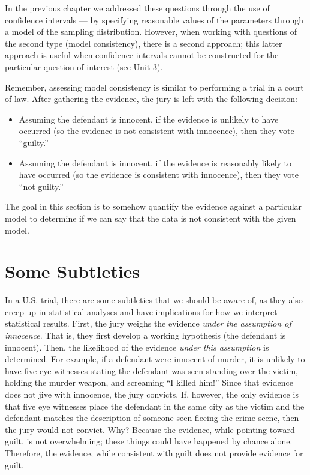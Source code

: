 \documentclass[]{book}
\providecommand{\tightlist}{%
  \setlength{\itemsep}{0pt}\setlength{\parskip}{0pt}}
\theoremstyle{plain}
\theoremstyle{mydefn}
\theoremstyle{myexmpl}
\theoremstyle{remark}
\begin{document}
In the previous chapter we addressed these questions through the use of
confidence intervals --- by specifying reasonable values of the
parameters through a model of the sampling distribution. However, when
working with questions of the second type (model consistency), there is
a second approach; this latter approach is useful when confidence
intervals cannot be constructed for the particular question of interest
(see Unit 3).

Remember, assessing model consistency is similar to performing a trial
in a court of law. After gathering the evidence, the jury is left with
the following decision:

\begin{itemize}
\tightlist
\item
  Assuming the defendant is innocent, if the evidence is unlikely to
  have occurred (so the evidence is not consistent with innocence), then
  they vote ``guilty.''
\item
  Assuming the defendant is innocent, if the evidence is reasonably
  likely to have occurred (so the evidence is consistent with
  innocence), then they vote ``not guilty.''
\end{itemize}

The goal in this section is to somehow quantify the evidence against a
particular model to determine if we can say that the data is not
consistent with the given model.

\section{Some Subtleties}\label{some-subtleties}

In a U.S. trial, there are some subtleties that we should be aware of,
as they also creep up in statistical analyses and have implications for
how we interpret statistical results. First, the jury weighs the
evidence \emph{under the assumption of innocence}. That is, they first
develop a working hypothesis (the defendant is innocent). Then, the
likelihood of the evidence \emph{under this assumption} is determined.
For example, if a defendant were innocent of murder, it is unlikely to
have five eye witnesses stating the defendant was seen standing over the
victim, holding the murder weapon, and screaming ``I killed him!'' Since
that evidence does not jive with innocence, the jury convicts. If,
however, the only evidence is that five eye witnesses place the
defendant in the same city as the victim and the defendant matches the
description of someone seen fleeing the crime scene, then the jury would
not convict. Why? Because the evidence, while pointing toward guilt, is
not overwhelming; these things could have happened by chance alone.
Therefore, the evidence, while consistent with guilt does not provide
evidence for guilt.
\end{document}
